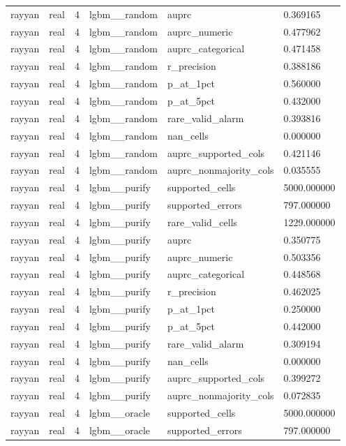 \begin{tabular}{llllll}
rayyan & real & 4 & lgbm\_\_random & auprc & 0.369165 \\
rayyan & real & 4 & lgbm\_\_random & auprc\_numeric & 0.477962 \\
rayyan & real & 4 & lgbm\_\_random & auprc\_categorical & 0.471458 \\
rayyan & real & 4 & lgbm\_\_random & r\_precision & 0.388186 \\
rayyan & real & 4 & lgbm\_\_random & p\_at\_1pct & 0.560000 \\
rayyan & real & 4 & lgbm\_\_random & p\_at\_5pct & 0.432000 \\
rayyan & real & 4 & lgbm\_\_random & rare\_valid\_alarm & 0.393816 \\
rayyan & real & 4 & lgbm\_\_random & nan\_cells & 0.000000 \\
rayyan & real & 4 & lgbm\_\_random & auprc\_supported\_cols & 0.421146 \\
rayyan & real & 4 & lgbm\_\_random & auprc\_nonmajority\_cols & 0.035555 \\
rayyan & real & 4 & lgbm\_\_purify & supported\_cells & 5000.000000 \\
rayyan & real & 4 & lgbm\_\_purify & supported\_errors & 797.000000 \\
rayyan & real & 4 & lgbm\_\_purify & rare\_valid\_cells & 1229.000000 \\
rayyan & real & 4 & lgbm\_\_purify & auprc & 0.350775 \\
rayyan & real & 4 & lgbm\_\_purify & auprc\_numeric & 0.503356 \\
rayyan & real & 4 & lgbm\_\_purify & auprc\_categorical & 0.448568 \\
rayyan & real & 4 & lgbm\_\_purify & r\_precision & 0.462025 \\
rayyan & real & 4 & lgbm\_\_purify & p\_at\_1pct & 0.250000 \\
rayyan & real & 4 & lgbm\_\_purify & p\_at\_5pct & 0.442000 \\
rayyan & real & 4 & lgbm\_\_purify & rare\_valid\_alarm & 0.309194 \\
rayyan & real & 4 & lgbm\_\_purify & nan\_cells & 0.000000 \\
rayyan & real & 4 & lgbm\_\_purify & auprc\_supported\_cols & 0.399272 \\
rayyan & real & 4 & lgbm\_\_purify & auprc\_nonmajority\_cols & 0.072835 \\
rayyan & real & 4 & lgbm\_\_oracle & supported\_cells & 5000.000000 \\
rayyan & real & 4 & lgbm\_\_oracle & supported\_errors & 797.000000 \\

\end{tabular}
